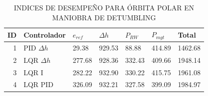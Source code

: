 
\begin{table}[!h]
	\label{table:Detumbling_polar}
	\caption{\MakeUppercase{Indices de desempeño para órbita polar en maniobra de Detumbling}}
	\centering
	\begin{tabular}{r|lllll|l}
		\multicolumn{1}{l|}{\textbf{ID}} & \textbf{Controlador}                  & \mbox{\boldmath$e_{ref}$}   & \mbox{\boldmath$\Delta h$} & \mbox{\boldmath$P_{RW}$}   & \mbox{\boldmath$P_{mgt}$}    & \textbf{Total}      \\ 
		\hline
		1                       & PID $\Delta h$ & 29.38 & 929.53& 88.88 & 414.89 & 1462.68  \\
		2                       & LQR $\Delta h$ & 277.68 & 928.36 &332.43 &409.66 & 1948.14  \\
		3                       & LQR I          & 282.22 & 932.90 &330.22 & 415.75 &1961.08  \\
		4                       & LQR PID        & 326.09 & 932.21 & 327.58 & 399.09 & 1984.97  \\
		\hline
	\end{tabular}
\end{table}
\clearpage


